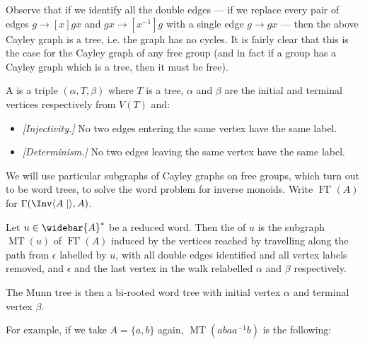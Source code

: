 \documentclass[noindex,noinsetproof,emphthm,12pt]{lmaths}
\newcommand{\Abar}{\widebar{A}}
\DeclareMathOperator{\FGamma}{F\Gamma}
\DeclareMathOperator{\MT}{MT}
\begin{document}
\begin{center}
	\end{center}

Observe that if we identify all the double edges --- if we replace every pair of edges $g \to[x] gx$ and $gx \to[x^{-1}] g$ with a single edge $g \to gx$ --- then the above Cayley graph is a tree, i.e. the graph has no cycles. It is fairly clear that this is the case for the Cayley graph of any free group (and in fact if a group has a Cayley graph which is a tree, then it must be free).


\begin{defn}
	A  is a triple $(\alpha, T, \beta)$ where $T$ is a tree, $\alpha$ and $\beta$ are the initial and terminal vertices respectively from $V(T)$ and:
	\begin{itemize}[(i)]
		\item \emph{[Injectivity.]} No two edges entering the same vertex have the same label.
		\item \emph{[Determinism.]} No two edges leaving the same vertex have the same label.
	\end{itemize}
\end{defn}

We will use particular subgraphs of Cayley graphs on free groups, which turn out to be word trees, to solve the word problem for inverse monoids. Write $\FGamma(A)$ for $\Gamma(\Inv \langle A \mid\rangle, A)$.

\begin{defn}
	Let $u \in \Abar^*$ be a reduced word. Then the  of $u$ is the subgraph $\MT(u)$ of $\FGamma(A)$ induced by the vertices reached by travelling along the path from $\epsilon$ labelled by $u$, with all double edges identified and all vertex labels removed, and $\epsilon$ and the last vertex in the walk relabelled $\alpha$ and $\beta$ respectively. 
\end{defn}

The Munn tree is then a bi-rooted word tree with initial vertex $\alpha$ and terminal vertex $\beta$.

For example, if we take $A = \{a, b\}$ again, $\MT(abaa^{-1}b)$ is the following:
\end{document}
